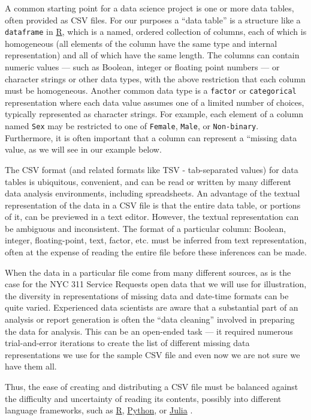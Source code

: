\documentclass[
  12pt]{article}
\begin{document}
A common starting point for a data science project is one or more data
tables, often provided as CSV files. For our purposes a ``data table''
is a structure like a \texttt{dataframe} in
\href{https://www.r-project.org}{R}, which is a named, ordered
collection of columns, each of which is homogeneous (all elements of the
column have the same type and internal representation) and all of which
have the same length. The columns can contain numeric values --- such as
Boolean, integer or floating point numbers --- or character strings or
other data types, with the above restriction that each column must be
homogeneous. Another common data type is a \texttt{factor} or
\texttt{categorical} representation where each data value assumes one of
a limited number of choices, typically represented as character strings.
For example, each element of a column named \texttt{Sex} may be
restricted to one of \texttt{Female}, \texttt{Male}, or
\texttt{Non-binary}. Furthermore, it is often important that a column
can represent a ``missing data value, as we will see in our example
below.

The CSV format (and related formats like TSV - tab-separated values) for
data tables is ubiquitous, convenient, and can be read or written by
many different data analysis environments, including spreadsheets. An
advantage of the textual representation of the data in a CSV file is
that the entire data table, or portions of it, can be previewed in a
text editor. However, the textual representation can be ambiguous and
inconsistent. The format of a particular column: Boolean, integer,
floating-point, text, factor, etc. must be inferred from text
representation, often at the expense of reading the entire file before
these inferences can be made.

When the data in a particular file come from many different sources, as
is the case for the NYC 311 Service Requests open data that we will use
for illustration, the diversity in representations of missing data and
date-time formats can be quite varied. Experienced data scientists are
aware that a substantial part of an analysis or report generation is
often the ``data cleaning'' involved in preparing the data for analysis.
This can be an open-ended task --- it required numerous trial-and-error
iterations to create the list of different missing data representations
we use for the sample CSV file and even now we are not sure we have them
all.

Thus, the ease of creating and distributing a CSV file must be balanced
against the difficulty and uncertainty of reading its contents, possibly
into different language frameworks, such as
\href{https://www.R-project.org}{R}, \href{https://python.org}{Python},
or \href{https://julialang.org}{Julia}
\citep{Bezanson_Julia_A_fresh_2017}.
\end{document}
